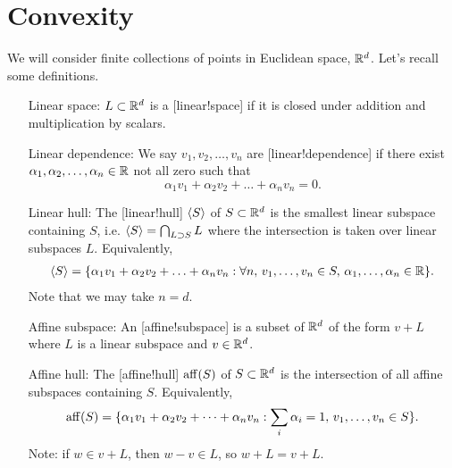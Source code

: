 
\section{Convexity}
We will consider finite collections of points in Euclidean space, $\mathbb{R}^d$. Let's recall some definitions.
\begin{itemize}[]
\item[Linear space:] $L\subset \mathbb{R}^d$ is a [linear!space] if it is closed under addition and multiplication by scalars.
\item[Linear dependence:] We say $v_1,v_2,\dotsc,v_n$ are [linear!dependence] if there exist $\alpha_1,\alpha_2,\dotsc,\alpha_n\in \mathbb{R}$ not all zero such that
\[
\alpha_1 v_1 + \alpha_2v_2 + \dotsc + \alpha_n v_n = 0.
\]
\item[Linear hull:] The [linear!hull] $\braket{S}$ of $S\subset \mathbb{R}^d$ is the smallest linear subspace containing $S$, i.e. $\braket{S}=\bigcap_{L\supset S} L$ where the intersection is taken over linear subspaces $L$. Equivalently,
\begin{align*}	
\braket{S} = \{ \alpha_1 v_1 + \alpha_2 v_2 + \dotsc + \alpha_n v_n: \forall n,\, v_1,\dotsc,v_n\in S,\, \alpha_1,\dotsc,\alpha_n\in \mathbb{R} \}.
\end{align*}
Note that we may take $n = d$.

\item[Affine subspace:] An [affine!subspace] is a subset of $\mathbb{R}^d$ of the form $v+ L$ where $L$ is a linear subspace and $v\in \mathbb{R}^d$.

\item[Affine hull:] The [affine!hull] $\operatorname{aff}(S)$ of $S\subset \mathbb{R}^d$ is the intersection of all affine subspaces containing $S$. Equivalently,
\[
\operatorname{aff}(S) = \{\alpha_1 v_1 + \alpha_2 v_2 + \dotsb + \alpha_n v_n : \sum_i \alpha_i= 1,\, v_1,\dotsc,v_n\in S\}.
\]
Note: if $w\in v+L$, then $w-v\in L$, so $w+L = v+L$. 


\end{itemize}
